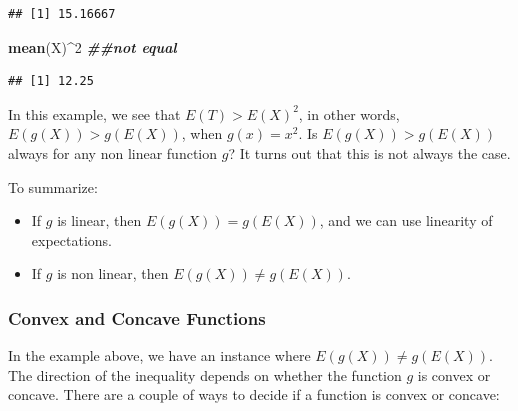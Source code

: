 \documentclass[
]{book}
\newenvironment{Shaded}{\begin{snugshade}}{\end{snugshade}}
\newcommand{\DecValTok}[1]{\textcolor[rgb]{0.00,0.00,0.81}{#1}}
\newcommand{\DocumentationTok}[1]{\textcolor[rgb]{0.56,0.35,0.01}{\textbf{\textit{#1}}}}
\newcommand{\FunctionTok}[1]{\textcolor[rgb]{0.13,0.29,0.53}{\textbf{#1}}}
\newcommand{\NormalTok}[1]{#1}
\newcommand{\SpecialCharTok}[1]{\textcolor[rgb]{0.81,0.36,0.00}{\textbf{#1}}}
\providecommand{\tightlist}{%
  \setlength{\itemsep}{0pt}\setlength{\parskip}{0pt}}
\begin{document}
\begin{verbatim}
## [1] 15.16667
\end{verbatim}

\begin{Shaded}
\begin{Highlighting}[]
\FunctionTok{mean}\NormalTok{(X)}\SpecialCharTok{\^{}}\DecValTok{2} \DocumentationTok{\#\#not equal}
\end{Highlighting}
\end{Shaded}

\begin{verbatim}
## [1] 12.25
\end{verbatim}

In this example, we see that \(E(T) > E(X)^2\), in other words, \(E(g(X)) > g(E(X))\), when \(g(x) = x^2\). Is \(E(g(X)) > g(E(X))\) always for any non linear function \(g\)? It turns out that this is not always the case.

To summarize:

\begin{itemize}
\tightlist
\item
  If \(g\) is linear, then \(E(g(X)) = g(E(X))\), and we can use linearity of expectations.
\item
  If \(g\) is non linear, then \(E(g(X)) \neq g(E(X))\).
\end{itemize}

\hypertarget{convex-and-concave-functions}{%
\subsubsection{Convex and Concave Functions}\label{convex-and-concave-functions}}

In the example above, we have an instance where \(E(g(X)) \neq g(E(X))\). The direction of the inequality depends on whether the function \(g\) is convex or concave. There are a couple of ways to decide if a function is convex or concave:
\end{document}
